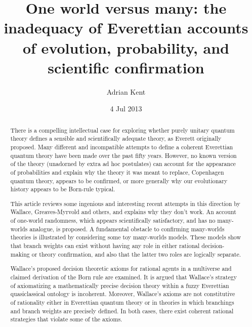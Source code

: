 \documentclass[aps,
pra,epsfig,12pt,nofootinbib]{revtex4}
\begin{document}
\title{One world versus many: the inadequacy of Everettian accounts 
of evolution, probability, and scientific confirmation}

\author{Adrian Kent}

\date{4 Jul 2013}

\begin{abstract}
There is a compelling intellectual case for exploring
whether purely unitary quantum theory defines a sensible and 
scientifically adequate theory, as Everett originally proposed.
Many different and incompatible attempts to define a coherent Everettian
quantum theory have been made over the past fifty years.  
However, no known version of the theory (unadorned by extra ad hoc postulates)
can account for the appearance of probabilities and explain why the 
theory it was meant to replace, Copenhagen quantum theory, 
appears to be confirmed, or more generally why our evolutionary history 
appears to be Born-rule typical. 

This article reviews some ingenious and interesting recent attempts in 
this direction by Wallace, Greaves-Myrvold and others, and explains
why they don't work.  An account of one-world randomness, 
which appears scientifically satisfactory, and has no many-worlds
analogue, is proposed.  A fundamental obstacle to confirming many-worlds
theories is illustrated by considering some toy 
many-worlds models.  These models show that branch weights can exist without
having any role in either rational decision-making or theory confirmation,
and also that the latter two roles are logically separate. 

Wallace's proposed decision theoretic axioms for rational agents in 
a multiverse and claimed derivation of the Born rule 
are examined.  It is argued that
Wallace's strategy of axiomatizing a mathematically precise decision theory 
within a fuzzy Everettian quasiclassical ontology is incoherent.   
Moreover, Wallace's axioms 
are not constitutive of rationality either in Everettian quantum theory
or in theories in which branchings and branch weights are precisely
defined.  In both cases, there exist coherent rational strategies 
that violate some of the axioms. 
\end{abstract}
\maketitle
\end{document}
